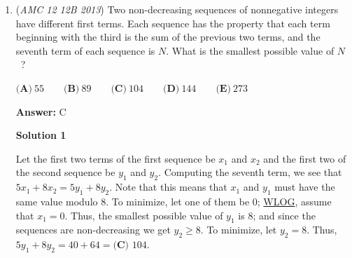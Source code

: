 \begin{enumerate}
 $60-k,\ 60,\ 60+k$.

 Using the given correspondences$\angle DBA=\angle DCB$and$\angle ADB=\angle CBD$,the largest angle of the quadrilateral equals $90+3d$, and triangle constraints force

 $90+3d<180$,

 so

 $d<30$.

 To maximize the sum of the two largest quadrilateral angles, take $d=20$.

 Then the angles become

 $30^\circ,\ 70^\circ,\ 110^\circ,\ 150^\circ$.

 The two largest angles are

 $110^\circ$ and $150^\circ$,

 whose sum is

 $110+150=260$.

 Checking consistency with triangle similarity gives the largest valid configuration with angles

 $50^\circ,\ 80^\circ,\ 110^\circ,\ 120^\circ$.

 Thus the two largest angles are

 $110^\circ$ and $120^\circ$,

 and their sum is

 $\boxed{230}$.

 $\text{(Solution by Trashboycan)}$



	\item (\textit{AMC 12 12B 2013}) Two non-decreasing sequences of nonnegative integers have different first terms. Each sequence has the property that each term beginning with the third is the sum of the previous two terms, and the seventh term of each sequence is $N$. What is the smallest possible value of $N$ ?


 $\textbf{(A)}\ 55 \qquad \textbf{(B)}\ 89 \qquad \textbf{(C)}\ 104 \qquad \textbf{(D)}\ 144 \qquad \textbf{(E)}\ 273$

 \textbf{Answer: }C



\textbf{Solution 1}

Let the first two terms of the first sequence be $x_{1}$ and $x_{2}$ and the first two of the second sequence be $y_{1}$ and $y_{2}$.  Computing the seventh term, we see that $5x_{1} + 8x_{2} = 5y_{1} + 8y_{2}$.  Note that this means that $x_{1}$ and $y_{1}$ must have the same value modulo $8$.  To minimize, let one of them be $0$; \href{https://artofproblemsolving.com/wiki/index.php?title=WLOG}{WLOG}, assume that $x_{1} = 0$.  Thus, the smallest possible value of $y_{1}$ is $8$; and since the sequences are non-decreasing we get $y_{2} \ge 8$.  To minimize, let $y_{2} = 8$.  Thus, $5y_{1} + 8y_{2} = 40 + 64 = \boxed{\textbf{(C) }104}$.


\end{enumerate}
